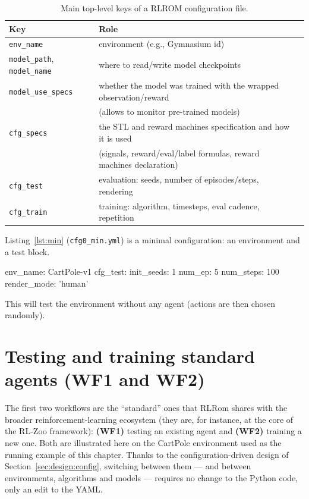 \begin{table}[htbp]
  \centering
  \caption{Main top-level keys of a \textsc{RLROM} configuration file.}
  \label{tab:config}
  \small
  \begin{tabular}{@{}llp{9.2cm}@{}}
    \toprule
    \textbf{Key} &  \textbf{Role} \\
    \midrule
    \texttt{env\_name}  & environment (e.g., Gymnasium id) \\
    \texttt{model\_path}, \texttt{model\_name} & where to read/write model checkpoints \\
    \texttt{model\_use\_specs}  & whether the model was trained with the wrapped
                                  observation/reward\\
                                  &(allows to monitor pre-trained models) \\
    \texttt{cfg\_specs}  & the STL and reward machines specification and how it is used \\
    &(signals,
      reward/eval/label formulas, reward machines declaration) \\
    \texttt{cfg\_test}  & evaluation: seeds, number of episodes/steps, rendering \\
    \texttt{cfg\_train}  & training: algorithm, timesteps, eval cadence, repetition \\
    \bottomrule
  \end{tabular}
\end{table}

Listing~\ref{lst:min} (\texttt{cfg0\_min.yml}) is a minimal 
configuration: an environment and a test block. 

\begin{cfglisting}[caption={Minimal configuration
(\texttt{examples/cartpole/cfg0\_min.yml}).},label={lst:min}]
env_name: CartPole-v1
cfg_test:
  init_seeds: 1
  num_ep: 5
  num_steps: 100
  render_mode: 'human'
\end{cfglisting}

This will test the environment without any agent (actions are then chosen randomly).

\section{Testing and training standard agents (WF1 and WF2)}
\label{sec:testing}

The first two workflows are the ``standard'' ones that RLRom shares with the
broader reinforcement-learning ecosystem (they are, for instance, at the core of
the RL-Zoo framework): \textbf{(WF1)} testing an existing agent and
\textbf{(WF2)} training a new one. Both are illustrated here on the CartPole
environment used as the running example of this chapter. Thanks to the
configuration-driven design of Section~\ref{sec:design:config}, switching between
them --- and between environments, algorithms and models --- requires no change to
the Python code, only an edit to the YAML.

